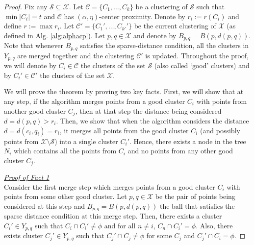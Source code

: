 \documentclass[11pt]{article}
\newcommand{\mc}{\mathcal}
\begin{document}
\begin{proof}
Fix any $\mc S \subseteq \mc X$. Let $\mc C = \{C_1, \ldots, C_k\}$ be a clustering of $\mc S$ such that $\min |C_i| = t$ and $\mc C$ has $(\alpha, \eta)$-center proximity. Denote by $r_i := r(C_i)$ and define $r := \max r_i$. Let $\mc C' = \{C_1', \ldots, C_{k'}'\}$ be the current clustering of $\mc X$ (as defined in Alg. \ref{alg:alphacp}). Let $p, q \in \mc X$ and denote by $B_{p, q} = B(p, d(p, q))$. Note that whenever $B_{p, q}$ satisfies the sparse-distance condition, all the clusters in $Y_{p, q}$ are merged together and the clustering $\mc C'$ is updated. Throughout the proof, we will denote by $C_i \in \mc C$ the clusters of the set $\mc S$ (also called `good' clusters) and by $C_i' \in \mc C'$ the clusters of the set $\mc X$.

We will prove the theorem by proving two key facts. First, we will show that at any step, if the algorithm merges points from a good cluster $C_i$ with points from another good cluster $C_j$, then at that step the distance being considered $d = d(p,q) > r_i$. Then, we show that when the algorithm considers the distance $d = d(c_i, q_i) = r_i$, it merges all points from the good cluster $C_i$ (and possibly points from $\mc X\setminus \mc S$) into a single cluster $C_i'$. Hence, there exists a node in the tree $N_i$ which contains all the points from $C_i$ and no points from any other good cluster $C_j$. 

\noindent\textit{\underline{Proof of Fact 1}}\\
Consider the first merge step which merges points from a good cluster $C_i$ with points from some other good cluster. Let $p, q \in \mc X$ be the pair of points being considered at this step and $B_{p,q} = B(p, d(p, q))$ the ball that satisfies the sparse distance condition at this merge step. Then, there exists a cluster $C_i' \in Y_{p,q}$ such that $C_i \cap C_i' \neq \phi$ and for all $n \neq i$, $C_n \cap C_i' = \phi$. Also, there exists cluster $C_j' \in Y_{p, q}$ such that $C_j' \cap C_j \neq \phi$ for some $C_j$ and $C_j' \cap C_i = \phi$.


\end{proof}
\end{document}
